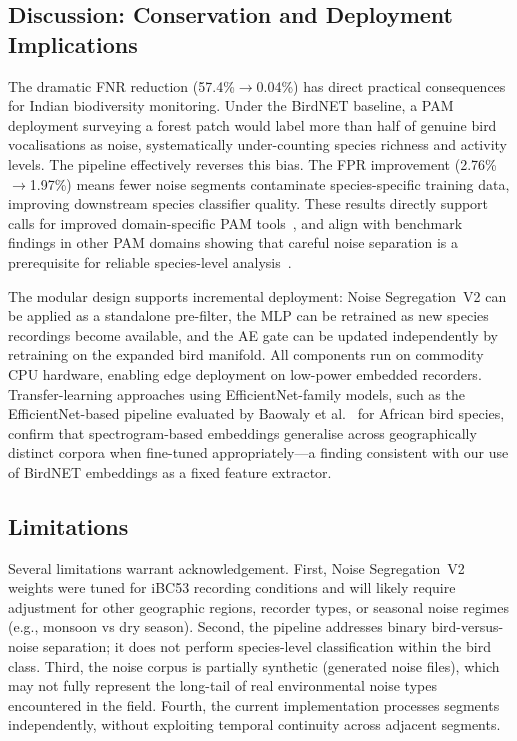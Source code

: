 \documentclass[conference]{IEEEtran}
\begin{document}
\subsection{Discussion: Conservation and Deployment Implications}

The dramatic FNR reduction (57.4\%$\to$0.04\%) has direct practical consequences for Indian biodiversity monitoring. Under the BirdNET baseline, a PAM deployment surveying a forest patch would label more than half of genuine bird vocalisations as noise, systematically under-counting species richness and activity levels. The pipeline effectively reverses this bias. The FPR improvement (2.76\%$\to$1.97\%) means fewer noise segments contaminate species-specific training data, improving downstream species classifier quality. These results directly support calls for improved domain-specific PAM tools~\cite{Rutz2023}, and align with benchmark findings in other PAM domains showing that careful noise separation is a prerequisite for reliable species-level analysis~\cite{Schall2024}.

The modular design supports incremental deployment: Noise Segregation~V2 can be applied as a standalone pre-filter, the MLP can be retrained as new species recordings become available, and the AE gate can be updated independently by retraining on the expanded bird manifold. All components run on commodity CPU hardware, enabling edge deployment on low-power embedded recorders. Transfer-learning approaches using EfficientNet-family models, such as the EfficientNet-based pipeline evaluated by Baowaly et al.~\cite{Baowaly2024} for African bird species, confirm that spectrogram-based embeddings generalise across geographically distinct corpora when fine-tuned appropriately---a finding consistent with our use of BirdNET embeddings as a fixed feature extractor.

\subsection{Limitations}

Several limitations warrant acknowledgement. First, Noise Segregation~V2 weights were tuned for iBC53 recording conditions and will likely require adjustment for other geographic regions, recorder types, or seasonal noise regimes (e.g., monsoon vs dry season). Second, the pipeline addresses binary bird-versus-noise separation; it does not perform species-level classification within the bird class. Third, the noise corpus is partially synthetic (generated noise files), which may not fully represent the long-tail of real environmental noise types encountered in the field. Fourth, the current implementation processes segments independently, without exploiting temporal continuity across adjacent segments.
\end{document}
